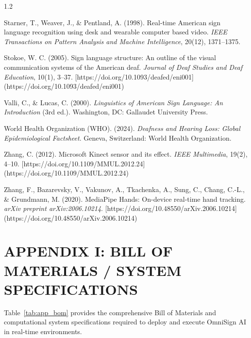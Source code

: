 \documentclass[12pt,a4paper]{report}
\begin{document}
\begin{spacing}{1.2}
\begin{enumerate}[label={[\arabic*]}, leftmargin=2.5em, itemsep=2pt]
\item Starner, T., Weaver, J., \& Pentland, A. (1998). Real-time American sign language recognition using desk and wearable computer based video. \textit{IEEE Transactions on Pattern Analysis and Machine Intelligence}, 20(12), 1371--1375.

\item Stokoe, W. C. (2005). Sign language structure: An outline of the visual communication systems of the American deaf. \textit{Journal of Deaf Studies and Deaf Education}, 10(1), 3--37. [https://doi.org/10.1093/deafed/eni001](https://doi.org/10.1093/deafed/eni001)

\item Valli, C., \& Lucas, C. (2000). \textit{Linguistics of American Sign Language: An Introduction} (3rd ed.). Washington, DC: Gallaudet University Press.

\item World Health Organization (WHO). (2024). \textit{Deafness and Hearing Loss: Global Epidemiological Factsheet}. Geneva, Switzerland: World Health Organization.

\item Zhang, C. (2012). Microsoft Kinect sensor and its effect. \textit{IEEE Multimedia}, 19(2), 4--10. [https://doi.org/10.1109/MMUL.2012.24](https://doi.org/10.1109/MMUL.2012.24)

\item Zhang, F., Bazarevsky, V., Vakunov, A., Tkachenka, A., Sung, C., Chang, C.-L., \& Grundmann, M. (2020). MediaPipe Hands: On-device real-time hand tracking. \textit{arXiv preprint arXiv:2006.10214}. [https://doi.org/10.48550/arXiv.2006.10214](https://doi.org/10.48550/arXiv.2006.10214)
\end{enumerate}
\end{spacing}
\clearpage

\appendix
\chapter*{APPENDIX I: BILL OF MATERIALS / SYSTEM SPECIFICATIONS}
\thispagestyle{plain}
\vspace{0.2cm}
\noindent Table~\ref{tab:app_bom} provides the comprehensive Bill of Materials and computational system specifications required to deploy and execute OmniSign AI in real-time environments.
\end{document}
